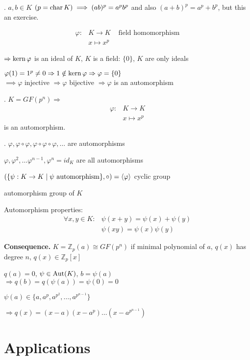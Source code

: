 \Lemma.
$a,b \in K$ $(p= \operatorname{char} K) \implies (ab)^p = a^p b^p$ and also $(a+b)^p = a^p + b^p$, but this an exercise.

\begin{align*}
  \varphi : &K \rightarrow K & \text{ field homomorphism}\\
    & x \mapsto x^p
\end{align*}

$\Rightarrow \operatorname{kern} \varphi$ is an ideal of $K$, $K$ is a field: $\{0\}$, $K$ are only ideals

$\varphi(1) = 1^p \neq 0 \Rightarrow 1 \notin \operatorname{kern} \varphi \Rightarrow \varphi = \{0\}$\\
$\implies \varphi$ injective $\Rightarrow \varphi$ bijective $\Rightarrow \varphi$ is an automorphism

\Theorem.
$K = GF(p^n) \Rightarrow $
\begin{align*}
  \varphi : &K \rightarrow K \\
    & x \mapsto x^p
\end{align*}
is an automorphism.

\Remark.
$\varphi, \varphi\circ \varphi, \varphi\circ\varphi\circ\varphi, \ldots$ are automorphisms

$\varphi, \varphi^2, \ldots \varphi^{n-1}, \varphi^n = id_K$ are all automorphisms

$( \{\psi: K \rightarrow K \mid \psi \text{ automorphism}\}, \circ ) = \left\langle \varphi \right\rangle$ cyclic group

automorphism group of $K$

Automorphism properties:
\begin{align*}
  \forall x,y \in K:
    & \psi(x+y) = \psi(x) + \psi(y)\\
    & \psi(xy) = \psi(x)\psi(y)
\end{align*}

\textbf{Consequence.}
$K = \mathbb{Z}_p(a) \cong GF(p^n)$ if minimal polynomial of $a$, $q(x)$ has degree $n$, $q(x) \in \mathbb{Z}_p[x]$

$q(a) = 0$, $\psi \in \operatorname{Aut}(K)$, $b = \psi(a)$\\
$\Rightarrow q(b) = q(\psi(a)) = \psi(0) = 0$

$\psi(a) \in \{a, a^p, a^{p^2}, \ldots, a^{p^{n-1}} \}$

$\Rightarrow q(x) = (x-a)(x-a^p) \ldots (x-a^{p^{n-1}})$

\section{Applications}
